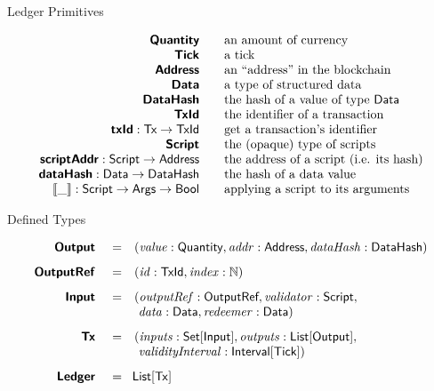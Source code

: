 \newcommand\bs[1]{\mbox{\textbf{\s{#1}}}}

\begin{frame}{Ledger Primitives}

\begin{displaymath}
\begin{array}{rll}
  \bs{Quantity} && \mbox{an amount of currency}\\
  \bs{Tick}  && \mbox{a tick}\\
  \bs{Address} && \mbox{an ``address'' in the blockchain}\\
  \bs{Data}  && \mbox{a type of structured data}\\
  \bs{DataHash} && \mbox{the hash of a value of type \Data{}}\\
  \bs{TxId} && \mbox{the identifier of a transaction}\\
  \bs{txId} : \s{Tx} \rightarrow \s{TxId} && \mbox{get a transaction's identifier}\\
  \bs{Script} && \mbox{the (opaque) type of scripts}\\
  \bs{scriptAddr} : \s{Script} \rightarrow \s{Address} && \mbox{the address of a script (i.e. its hash)}\\
  \bs{dataHash} : \s{Data} \rightarrow \s{DataHash} && \mbox{the hash of a data value}\\
  \mathbf{\llbracket \_ \rrbracket} : \script \rightarrow \s{Args} \rightarrow \s{Bool} && \mbox{applying a script to its arguments}\\
\end{array}
\end{displaymath}

\end{frame}

\begin{frame}{Defined Types}

\begin{displaymath}
\begin{array}{rll}
  \bs{Output }    &=&(\val: \qty, \addr: \Address, \dataHsh: \DataHash)\\[8pt]

  \bs{OutputRef } &=&(\txrefid: \TxId, \idx: \N)\\[8pt]

  \bs{Input }     &=&(\outputref: \s{OutputRef}, \validator: \script,\\
                  & &\ \dataVal: \Data, \redeemerVal: \Data)\\[8pt]

  \bs{Tx }        &=&(\inputs: \Set{\s{Input}}, \outputs: \List{\s{Output}},\\
                  & &\ \validityInterval: \Interval{\tick})\\[8pt]

  \bs{Ledger }    &=&\!\List{\eutxotx}\\
\end{array}
\end{displaymath}

\end{frame}
